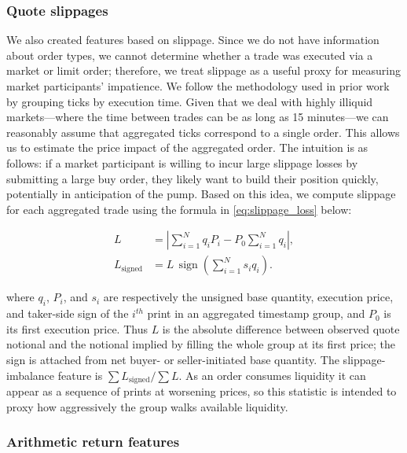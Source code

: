 \documentclass{ieeeaccess}
\begin{document}
\subsubsection{Quote slippages}

We also created features based on slippage. Since we do not have information about order types, we cannot determine whether a trade was executed via a market or limit order; therefore, we treat slippage as a useful proxy for measuring market participants’ impatience. We follow the methodology used in prior work by grouping ticks by execution time. Given that we deal with highly illiquid markets—where the time between trades can be as long as 15 minutes—we can reasonably assume that aggregated ticks correspond to a single order. This allows us to estimate the price impact of the aggregated order. The intuition is as follows: if a market participant is willing to incur large slippage losses by submitting a large buy order, they likely want to build their position quickly, potentially in anticipation of the pump. Based on this idea, we compute slippage for each aggregated trade using the formula in \eqref{eq:slippage_loss} below:

\begin{equation}
    \begin{aligned}
        L &= \left|\sum_{i=1}^{N} q_i P_i-P_0\sum_{i=1}^{N}q_i\right|, \\
        L_{\mathrm{signed}} &= L\,\operatorname{sign}\!\left(\sum_{i=1}^{N}s_iq_i\right).
    \end{aligned}
    \label{eq:slippage_loss}
\end{equation}

where $q_i$, $P_i$, and $s_i$ are respectively the unsigned base quantity, execution price, and taker-side sign of the $i^{th}$ print in an aggregated timestamp group, and $P_0$ is its first execution price. Thus $L$ is the absolute difference between observed quote notional and the notional implied by filling the whole group at its first price; the sign is attached from net buyer- or seller-initiated base quantity. The slippage-imbalance feature is $\sum L_{\mathrm{signed}}/\sum L$. As an order consumes liquidity it can appear as a sequence of prints at worsening prices, so this statistic is intended to proxy how aggressively the group walks available liquidity.

\subsubsection{Arithmetic return features}
\end{document}
